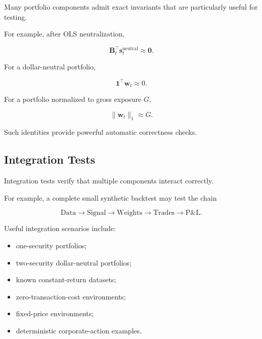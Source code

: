 \documentclass[11pt,a4paper]{article}
\begin{document}
Many portfolio components admit exact invariants that are particularly useful
for testing.

For example, after OLS neutralization,

\begin{equation}
\boxed{
\mathbf{B}_t^\top
\mathbf{s}_t^{\mathrm{neutral}}
\approx
\mathbf{0}.
}
\end{equation}

For a dollar-neutral portfolio,

\begin{equation}
\boxed{
\mathbf{1}^\top
\mathbf{w}_t
\approx
0.
}
\end{equation}

For a portfolio normalized to gross exposure $G$,

\begin{equation}
\boxed{
\|\mathbf{w}_t\|_1
\approx
G.
}
\end{equation}

Such identities provide powerful automatic correctness checks.


\subsection{Integration Tests}
\label{subsec:integration_tests}

Integration tests verify that multiple components interact correctly.

For example, a complete small synthetic backtest may test the chain

\begin{equation}
\boxed{
\text{Data}
\rightarrow
\text{Signal}
\rightarrow
\text{Weights}
\rightarrow
\text{Trades}
\rightarrow
\text{P\&L}.
}
\end{equation}

Useful integration scenarios include:

\begin{itemize}
    \item one-security portfolios;
    \item two-security dollar-neutral portfolios;
    \item known constant-return datasets;
    \item zero-transaction-cost environments;
    \item fixed-price environments;
    \item deterministic corporate-action examples.
\end{itemize}
\end{document}
